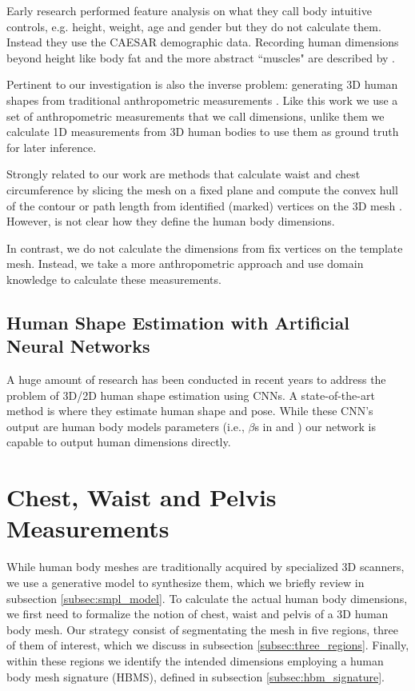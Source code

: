 \documentclass[runningheads, orivec]{llncs}
\begin{document}
Early research performed feature analysis on what they 
call body intuitive controls, e.g. height, weight, age and gender \cite{Allen.2003}  but they do not 
calculate them. Instead they use the CAESAR demographic data. Recording human dimensions beyond height like body fat and the more abstract ``muscles" are described by \cite{HaslerSSRS09}.

Pertinent to our investigation is also the inverse problem: generating 3D human 
shapes from traditional anthropometric measurements \cite{Wuhrer.2013}. Like this work we use a set of 
anthropometric measurements that we call dimensions, unlike them we calculate 
1D measurements from 3D human bodies to use them as ground truth for later 
inference.

Strongly related to our work are methods that calculate waist and 
chest circumference by slicing the mesh on a fixed plane and compute the convex hull of the contour \cite{Guan.2013} or path length from identified (marked) 
vertices on the 3D mesh \cite{Boisvert.2013,Dibra.2016a,Dibra.2016b}. However, is not clear how they define the human body dimensions.

In contrast, we do not 
calculate the dimensions from fix vertices on the template 
mesh. Instead, we 
take a more anthropometric approach and use domain knowledge to calculate these 
measurements.

\subsection{Human Shape Estimation with Artificial Neural Networks}
A huge amount of research has been conducted in recent years to address the 
problem of 3D/2D human shape estimation using CNNs. A state-of-the-art method 
is \cite{kanazawaHMR18} where they estimate human 
shape and pose. While these CNN's output are human body models parameters 
(i.e., $\beta$s in \cite{Dibra.2016a} and \cite{varol18_bodynet}) our network 
is 
capable to output human dimensions directly.

\section{Chest, Waist and Pelvis Measurements}\label{sec:approach}
While human body 
meshes are traditionally acquired by specialized 3D scanners, we use a 
generative model to synthesize them, which we briefly review in 
subsection \ref{subsec:smpl_model}. To calculate the actual human body 
dimensions, we first need to formalize the 
notion of chest, waist and pelvis of a 3D human body mesh. Our strategy consist 
of segmentating the mesh in five regions, 
three of them of interest, which we 
discuss in subsection \ref{subsec:three_regions}. Finally, within these regions 
we identify the intended dimensions employing a human body mesh signature 
(HBMS), 
defined in subsection \ref{subsec:hbm_signature}.
\end{document}

